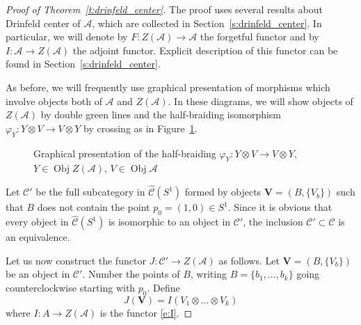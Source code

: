 \documentclass{amsart}
\theoremstyle{definition}
\theoremstyle{remark}
\numberwithin{equation}{section}
\newcommand{\firef}[1]{Figure~{\rm\ref{#1}}}
\newcommand{\thref}[1]{Theorem~{\rm\ref{#1}}}
\newcommand{\seref}[1]{Section~{\rm\ref{#1}}}
\newcommand{\<}{\langle}
\renewcommand{\>}{\rangle}
\newcommand{\C}{\mathcal{C}}      %
\newcommand{\Chat}{\widehat{\mathcal{C}}}      %
\newcommand{\A}{\mathcal{A}}      %
\newcommand{\VV}{\mathbf{V}}       %
\newcommand{\ph}{\varphi}
\DeclareMathOperator{\Obj}{Obj}
\begin{document}
\begin{proof}[Proof of \thref{t:drinfeld_center}]

The proof uses several results about Drinfeld center of $\A$, which 
are collected in \seref{s:drinfeld_center}. In particular, we will 
denote by $F\colon Z(\A)\to \A$ the forgetful functor and by 
$I\colon \A\to Z(\A)$ the adjoint functor. Explicit description 
of this functor can be found in \seref{s:drinfeld_center}.


As before, we will frequently use graphical presentation of morphisms
which involve objects both of $\A$ and $Z(\A)$. In these diagrams, we
will show objects of $Z(\A)$ by double green lines   and the
half-braiding isomorphism $\ph_Y\colon Y\otimes V\to V\otimes Y$  by
crossing as in \firef{f:crossing}.
\begin{figure}[ht]

\caption{Graphical presentation of the half-braiding $\ph_Y\colon Y\otimes
V\to V\otimes Y$, $Y\in \Obj Z(\A)$, $V\in \Obj \A$}\label{f:crossing}
\end{figure}




Let $\C'$ be the full subcategory in $\Chat(S^1)$ formed by objects
$\VV=(B, \{V_b\})$ such that $B$ does not contain the point $p_0=(1,0)\in S^1$.
Since it is obvious that every object in $\Chat(S^1)$ is isomorphic to an
object in $\C'$, the inclusion $\C'\subset \C$ is an equivalence.

Let us now construct the functor $J\colon \C'\to Z(\A)$ as follows. Let 
$\VV=(B, \{V_b\})$ be an object in $\C'$. Number the points of $B$, writing
$B=\{b_1, \dots, b_k\}$ going counterclockwise
starting with $p_0$. Define
$$
J(\VV)=I(V_1\otimes\dots \otimes V_k)
$$
where $I\colon A\to Z(\A)$ is the functor \eqref{e:I}. 


\end{proof}
\end{document}
